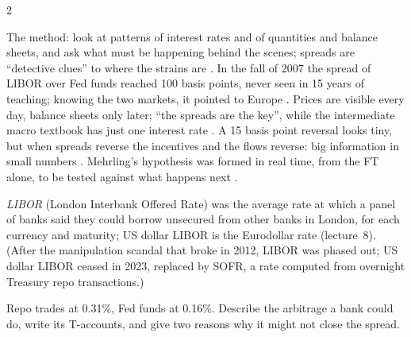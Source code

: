 \begin{paracol}{2}
\begin{finance}
The method: look at patterns of interest rates and of quantities and balance sheets, and ask what must be happening behind the scenes; spreads are ``detective clues'' to
where the strains are . In the fall of 2007 the spread of LIBOR over Fed funds reached 100 basis points, never seen in 15 years of teaching;
knowing the two markets, it pointed to Europe . Prices are visible every day, balance sheets only later; ``the spreads are the key'', while the
intermediate macro textbook has just one interest rate . A 15 basis point reversal looks tiny, but when spreads reverse the
incentives and the flows reverse: big information in small numbers . Mehrling's hypothesis was formed in real time, from the FT alone, to be
tested against what happens next .
\end{finance}

\begin{definition}
\emph{LIBOR} (London Interbank Offered Rate) was the average rate at which a panel of banks said they could borrow unsecured from other banks in London, for each
currency and maturity; US dollar LIBOR is the Eurodollar rate (lecture~8). (After the manipulation scandal that broke in 2012, LIBOR was phased out; US dollar LIBOR
ceased in 2023, replaced by SOFR, a rate computed from overnight Treasury repo transactions.)
\end{definition}

\flushside

\begin{exercise}
Repo trades at 0.31\%, Fed funds at 0.16\%. Describe the arbitrage a bank could do, write its T-accounts, and give two reasons why it might not close the spread.
\end{exercise}

\end{paracol}
